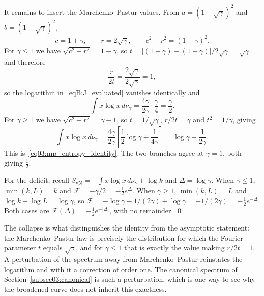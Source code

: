 \documentclass[11pt,letterpaper]{article}
\theoremstyle{plain}
\theoremstyle{definition}
\theoremstyle{remark}
\begin{document}
It remains to insert the Marchenko--Pastur values. From $a = (1-\sqrt\gamma)^2$ and $b = (1+\sqrt\gamma)^2$,
\begin{equation}
\label{eqB:mp_c_r}
c = 1 + \gamma, \qquad r = 2\sqrt{\gamma}, \qquad c^2 - r^2 = (1-\gamma)^2 .
\end{equation}
For $\gamma \le 1$ we have $\sqrt{c^2-r^2} = 1-\gamma$, so $t = \big[(1+\gamma)-(1-\gamma)\big]/2\sqrt{\gamma} = \sqrt{\gamma}$ and therefore
\begin{equation}
\label{eqB:collapse_small}
\frac{r}{2t} = \frac{2\sqrt{\gamma}}{2\sqrt{\gamma}} = 1 ,
\end{equation}
so the logarithm in~\eqref{eqB:J_evaluated} vanishes identically and
\begin{equation}
\label{eqB:result_small}
\int x \log x \, d\nu_\gamma = \frac{4\gamma}{2\gamma}\cdot\frac{\gamma}{4} = \frac{\gamma}{2}.
\end{equation}
For $\gamma \ge 1$ we have $\sqrt{c^2-r^2} = \gamma-1$, so $t = 1/\sqrt{\gamma}$, $r/2t = \gamma$ and $t^2 = 1/\gamma$, giving
\begin{equation}
\label{eqB:result_large}
\int x \log x \, d\nu_\gamma = \frac{4\gamma}{2\gamma}\left[\frac{1}{2}\log\gamma + \frac{1}{4\gamma}\right] = \log\gamma + \frac{1}{2\gamma}.
\end{equation}
This is~\eqref{eq03:mp_entropy_identity}. The two branches agree at $\gamma = 1$, both giving $\tfrac12$.

For the deficit, recall $S_{\mathrm{vN}} = -\int x\log x\, d\nu_\gamma + \log k$ and $\Delta = \log\gamma$. When $\gamma \le 1$, $\min(k,L) = k$ and $\mathcal{F} = -\gamma/2 = -\tfrac12 e^{\Delta}$. When $\gamma \ge 1$, $\min(k,L) = L$ and $\log k - \log L = \log\gamma$, so $\mathcal{F} = -\log\gamma - 1/(2\gamma) + \log\gamma = -1/(2\gamma) = -\tfrac12 e^{-\Delta}$. Both cases are $\mathcal{F}(\Delta) = -\tfrac12 e^{-|\Delta|}$, with no remainder. \qed

The collapse is what distinguishes the identity from the asymptotic statement: the Marchenko--Pastur law is precisely the distribution for which the Fourier parameter $t$ equals $\sqrt{\gamma}$, and for $\gamma\le1$ that is exactly the value making $r/2t = 1$. A perturbation of the spectrum away from Marchenko--Pastur reinstates the logarithm and with it a correction of order one. The canonical spectrum of Section~\ref{subsec03:canonical} is such a perturbation, which is one way to see why the broadened curve does not inherit this exactness.
\end{document}
